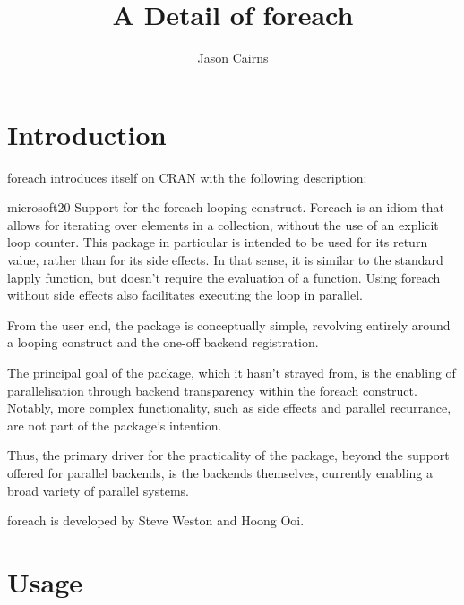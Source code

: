 \documentclass[a4paper,10pt]{article}
\begin{document}
\title{A Detail of foreach}
\author{Jason Cairns}
  
\maketitle{}

\section{Introduction}
\label{sec:introduction}

foreach introduces itself on CRAN with the following description:
\begin{displaycquote}{microsoft20}
	Support for the foreach looping construct. Foreach is an idiom that
	allows for iterating over elements in a collection, without the use
	of an explicit loop counter. This package in particular is intended
	to be used for its return value, rather than for its side effects.
	In that sense, it is similar to the standard lapply function, but
	doesn't require the evaluation of a function. Using foreach without
	side effects also facilitates executing the loop in parallel.
\end{displaycquote}

From the user end, the package is conceptually simple, revolving
entirely around a looping construct and the one-off backend
registration.

The principal goal of the package, which it hasn't strayed from, is
the enabling of parallelisation through backend transparency within
the foreach construct. Notably, more complex functionality, such as
side effects and parallel recurrance, are not part of the package's
intention.

Thus, the primary driver for the practicality of the package, beyond
the support offered for parallel backends, is the backends themselves,
currently enabling a broad variety of parallel systems.

foreach is developed by Steve Weston and Hoong Ooi.

\section{Usage}
\label{sec:usage}
\end{document}
